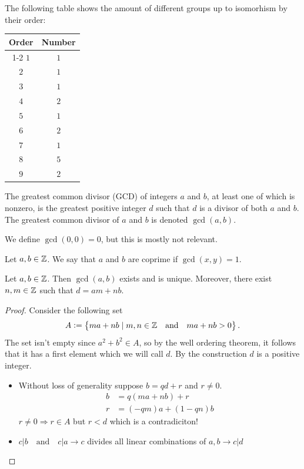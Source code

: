 \documentclass[11pt,a4paper]{article}
\begin{document}
  The following table shows the amount of different groups up to isomorhism
  by their order:
  \begin{center}
    \begin{tabular}{c | c}
        Order & Number \\
        \cline{1-2}
        $1$ & $1$ \\
        $2$ & $1$ \\
        $3$ & $1$ \\
        $4$ & $2$ \\
        $5$ & $1$ \\
        $6$ & $2$ \\
        $7$ & $1$ \\
        $8$ & $5$ \\
        $9$ & $2$
    \end{tabular}
  \end{center}

  \begin{definition}
    The greatest common divisor (GCD) of integers $a$ and $b$,
    at least one of which is nonzero,
    is the greatest positive integer $d$ such that $d$ is a divisor of 
    both $a$ and $b$.
    The greatest common divisor of $a$ and $b$ is denoted $\gcd(a,b)$.
  \end{definition}
  \begin{remark}
    We define $\gcd(0,0) = 0$, but this is mostly not relevant.
  \end{remark}

  \begin{definition}[Coprime]
    Let $a,b \in \mathbb{Z}$.
    We say that $a$ and $b$ are coprime if $\gcd(x,y) = 1$.
  \end{definition}

  \begin{proposition}
    Let $a,b \in \mathbb{Z}$. Then $\gcd(a,b)$ exists and is unique.
    Moreover, there exist $n,m \in \mathbb{Z}$ such that $d = am + nb$.
  \end{proposition}
  \begin{proof}
	Consider the following set
	\[
    A := \left\{ma + nb \mid m,n \in\mathbb{Z} \quad \text{and} \quad ma + nb > 0\right\}.
	\]
	The set isn't empty since $a^2 + b^2 \in A$,
  so by the well ordering theorem, it follows that it has a first element 
  which we will call $d$.
  By the construction $d$ is a positive integer.

	\begin{itemize}
		\item Without loss of generality suppose $b=qd+r$ and $r\ne 0$.
		\begin{align*}
			b &= q (ma + nb) + r \\
			r &= (-qm) a + (1 - qn) b
		\end{align*}
		$r \neq 0 \Rightarrow r \in A$ but $r < d$ which is a contradiciton!
		\item $c|b \quad\mathrm{and}\quad c|a \rightarrow c$ divides all linear 
      combinations of $a,b\rightarrow c|d$
	\end{itemize}
  \end{proof}
\end{document}
